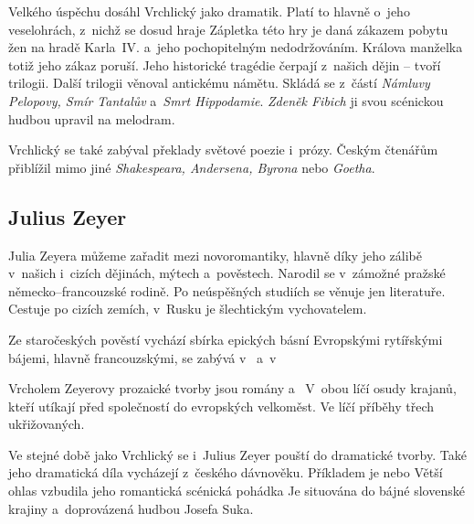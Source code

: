 Velkého úspěchu dosáhl Vrchlický jako dramatik. Platí to hlavně o~jeho
veselohrách, z~nichž se dosud hraje  Zápletka
této hry je daná zákazem pobytu žen na hradě Karla~IV. a~jeho
pochopitelným nedodržováním. Králova manželka totiž jeho zákaz poruší.
Jeho historické tragédie čerpají z~našich dějin -- 
 tvoří trilogii. Další trilogii 
věnoval antickému námětu. Skládá se z~částí \emph{Námluvy Pelopovy, Smír
Tantalův} a~\emph{Smrt Hippodamie}. \emph{Zdeněk Fibich} ji svou
scénickou hudbou upravil na melodram.

Vrchlický se také zabýval překlady světové poezie i~prózy. Českým
čtenářům přiblížil mimo jiné \emph{Shakespeara, Andersena, Byrona} 
nebo \emph{Goetha}.

\subsection*{Julius Zeyer}
Julia Zeyera můžeme zařadit mezi novoromantiky, hlavně díky jeho zálibě
v~našich i~cizích dějinách, mýtech a~pověstech. Narodil se v~zámožné
pražské německo--francouzské rodině. Po neúspěšných studiích se věnuje
jen literatuře. Cestuje po cizích zemích, v~Rusku je šlechtickým
vychovatelem.

Ze staročeských pověstí vychází sbírka epických básní 
Evropskými rytířskými bájemi, hlavně francouzskými, se zabývá
v~ a~v~

Vrcholem Zeyerovy prozaické tvorby jsou romány 
a~ V~obou líčí osudy krajanů, kteří utíkají
před společností do evropských velkoměst. Ve  líčí příběhy třech ukřižovaných.

Ve stejné době jako Vrchlický se i~Julius Zeyer pouští do dramatické
tvorby. Také jeho dramatická díla vycházejí z~českého dávnověku.
Příkladem je  nebo  Větší ohlas
vzbudila jeho romantická scénická pohádka 
Je situována do bájné slovenské krajiny a~doprovázená hudbou Josefa
Suka. 